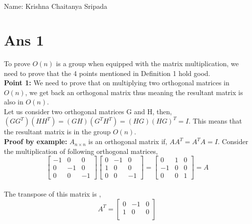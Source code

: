 \documentclass[10pt]{article}
\begin{document}
\section*{}
\begin{flushleft}
Name: Krishna Chaitanya Sripada\\
\end{flushleft}
\section*{Ans 1}
\begin{flushleft}
To prove $O(n)$ is a group when equipped with the matrix multiplication, we need to prove that the 4 points mentioned in Definition 1 hold good.\\
\vspace{0.5em}
\textbf{Point 1:} We need to prove that on multiplying two orthogonal matrices in $O(n)$, we get back an orthogonal matrix thus meaning the resultant matrix is also in $O(n)$.\\
Let us consider two orthogonal matrices G and H, then,\\
\vspace{0.5em}
$(G G^{T}) (H H^{T}) = (G H) (G^{T} H ^{T}) = (H G) (H G)^{T} = I$. This means that the resultant matrix is in the group $O(n)$.\\
\vspace{0.5em}
\textbf{Proof by example:} $A_{n \times n}$ is an orthogonal matrix if, $A A^{T} = A^{T} A = I$. Consider the multiplication of following orthogonal matrices,\\
$$
\begin{bmatrix} 
-1 & 0 & 0 \\
0 & -1 & 0 \\
0 & 0 & -1 
\end{bmatrix}
\begin{bmatrix} 
0 & -1 & 0 \\
1 & 0 & 0 \\
0 & 0 & -1 
\end{bmatrix}
= \begin{bmatrix} 
0 & 1 & 0 \\
-1 & 0 & 0 \\
0 & 0 & 1 
\end{bmatrix}
 = A
$$
\\
The transpose of this matrix is ,\\
$$
A^{T} =
\begin{bmatrix} 
0 & -1 & 0 \\
1 & 0 & 0 \\

\end{bmatrix}$$
\end{flushleft}
\end{document}
